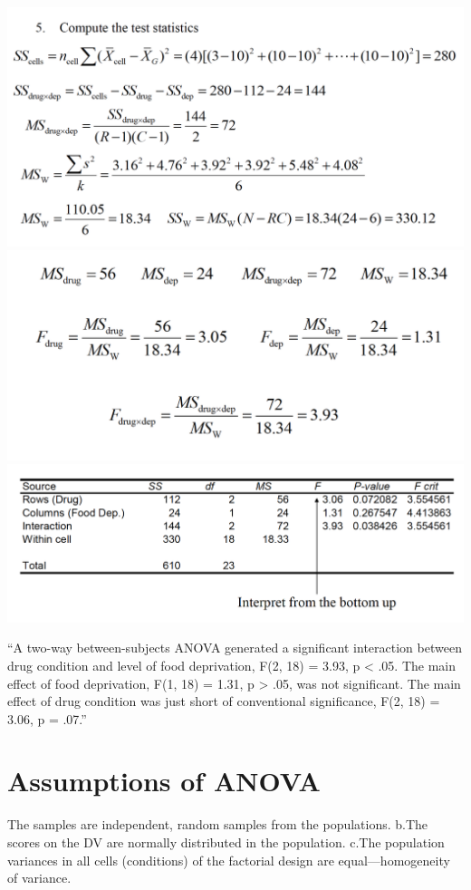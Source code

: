 \documentclass[]{book}
\theoremstyle{definition}
\theoremstyle{definition}
\theoremstyle{definition}
\theoremstyle{remark}
\begin{document}
\includegraphics{img/hicksfa14.png} \includegraphics{img/hicksfa15.png}
\includegraphics{img/hicksfa16.png}

``A two-way between-subjects ANOVA generated a significant interaction
between drug condition and level of food deprivation, F(2, 18) = 3.93, p
\textless{} .05. The main effect of food deprivation, F(1, 18) = 1.31, p
\textgreater{} .05, was not significant. The main effect of drug
condition was just short of conventional significance, F(2, 18) = 3.06,
p = .07.''

\section{Assumptions of ANOVA}\label{assumptions-of-anova-1}

The samples are independent, random samples from the populations. b.The
scores on the DV are normally distributed in the population. c.The
population variances in all cells (conditions) of the factorial design
are equal---homogeneity of variance.
\end{document}
